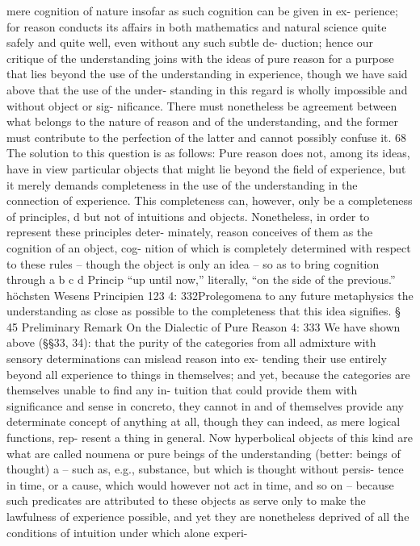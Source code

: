 mere cognition of nature insofar as such cognition can be given in ex-
perience; for reason conducts its affairs in both mathematics and natural
science quite safely and quite well, even without any such subtle de-
duction; hence our critique of the understanding joins with the ideas of
pure reason for a purpose that lies beyond the use of the understanding
in experience, though we have said above that the use of the under-
standing in this regard is wholly impossible and without object or sig-
niﬁcance. There must nonetheless be agreement between what belongs
to the nature of reason and of the understanding, and the former must
contribute to the perfection of the latter and cannot possibly confuse
it. 68
The solution to this question is as follows: Pure reason does not,
among its ideas, have in view particular objects that might lie beyond
the ﬁeld of experience, but it merely demands completeness in the use of
the understanding in the connection of experience. This completeness
can, however, only be a completeness of principles, d but not of intuitions
and objects. Nonetheless, in order to represent these principles deter-
minately, reason conceives of them as the cognition of an object, cog-
nition of which is completely determined with respect to these rules –
though the object is only an idea – so as to bring cognition through
a
b
c
d
Princip
“up until now,” literally, “on the side of the previous.”
höchsten Wesens
Principien
123
4: 332Prolegomena to any future metaphysics
the understanding as close as possible to the completeness that this idea
signiﬁes.
§ 45
Preliminary Remark
On the Dialectic of Pure Reason
4: 333
We have shown above (§§33, 34): that the purity of the categories from
all admixture with sensory determinations can mislead reason into ex-
tending their use entirely beyond all experience to things in themselves;
and yet, because the categories are themselves unable to ﬁnd any in-
tuition that could provide them with signiﬁcance and sense in concreto,
they cannot in and of themselves provide any determinate concept of
anything at all, though they can indeed, as mere logical functions, rep-
resent a thing in general. Now hyperbolical objects of this kind are what
are called noumena or pure beings of the understanding (better: beings
of thought) a – such as, e.g., substance, but which is thought without persis-
tence in time, or a cause, which would however not act in time, and so on –
because such predicates are attributed to these objects as serve only to
make the lawfulness of experience possible, and yet they are nonetheless
deprived of all the conditions of intuition under which alone experi-
